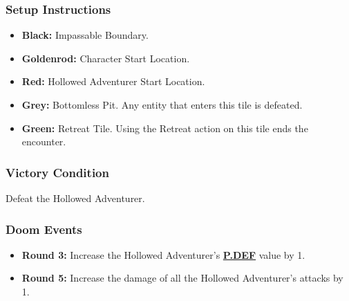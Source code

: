 \documentclass[12pt]{article}
\newcommand{\refto}[1]{\hyperlink{#1}{\textbf{#1}}}
\begin{document}
\subsubsection*{Setup Instructions}
\begin{itemize}
\item \textbf{Black:} Impassable Boundary.
\item \textbf{Goldenrod:} Character Start Location.
\item \textbf{Red:} Hollowed Adventurer Start Location.
\item \textbf{Grey:} Bottomless Pit. Any entity that enters this tile is defeated.
\item \textbf{Green:} Retreat Tile. Using the Retreat action on this tile ends the encounter.
\end{itemize}

\subsubsection*{Victory Condition}
Defeat the Hollowed Adventurer.

\subsubsection*{Doom Events}
\begin{itemize}
\item \textbf{Round 3:} Increase the Hollowed Adventurer’s \refto{P.DEF} value by 1.
\item \textbf{Round 5:} Increase the damage of all the Hollowed Adventurer’s attacks by 1.
\end{itemize}

\pagebreak
\end{document}
